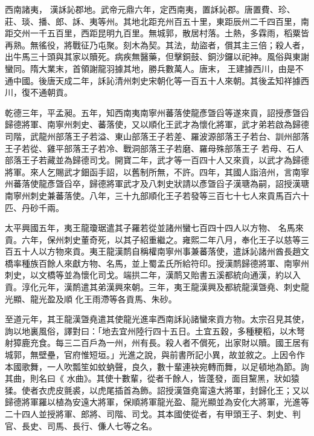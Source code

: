
\begin{pinyinscope}

 西南諸夷，
 漢訸訫郡地。武帝元鼎六年，定西南夷，置訸訫郡。唐置費、珍、莊、琰、播、郎、訸、夷等州。其地北距充州百五十里，東距辰州二千四百里，南距交州一千五百里，西距昆明九百里。無城郭，散居村落。土熱，多霖雨，稻粟皆再熟。無徭役，將戰征乃屯聚。刻木為契。其法，劫盜者，償其主三倍；殺人者，出牛馬三十頭與其家以贖死。病疾無醫藥，但擊銅鼓、銅沙鑼以祀神。風俗與東謝蠻同。隋大業末，首領謝龍羽據其地，勝兵數萬人。唐末，
 王建據西川，由是不通中國。後唐天成二年，訸訫清州刺史宋朝化等一百五十人來朝。其後孟知祥據西川，復不通朝貢。



 乾德三年，平孟昶。五年，知西南夷南寧州蕃落使龍彥曁舀等遂來貢，詔授彥曁舀歸德將軍、南寧州刺史、蕃落使，又以順化王武才為懷化將軍，武才弟若啟為歸德司階，武龍州部落王子若溢、東山部落王子若差、羅波源部落王子若台、訓州部落王子若從、雞平部落王子若冷、戰洞部落王子若磨、羅母殊部落王子
 若母、石人部落王子若藏並為歸德司戈。開寶二年，武才等一百四十人又來貢，以武才為歸德將軍。來人乞賜武才鈿函手詔，以舊制所無，不許。四年，其國人詣涪州，言南寧州蕃落使龍彥曁舀卒，歸德將軍武才及八刺史狀請以彥曁舀子漢瑭為嗣，詔授漢瑭南寧州刺史兼蕃落使。八年，三十九部順化王子若發等三百七十七人來貢馬百六十匹、丹砂千兩。



 太平興國五年，夷王龍瓊琚遣其子羅若從並諸州蠻七百四十四人以方物、
 名馬來貢。六年，保州刺史董奇死，以其子紹重繼之。雍熙二年八月，奉化王子以慈等三百五十人以方物來貢。夷王龍漢鸸自稱權南寧州事兼蕃落使，遣訸訫諸州酋長趙文橋率種族百餘人來獻方物、名馬，並上蜀孟氏所給符印。授漢鸸歸德將軍、南寧州刺史，以文橋等並為懷化司戈。端拱二年，漢鸸又貽書五溪都統向通漢，約以入貢。淳化元年，漢鸸遣其弟漢興來朝。三年，夷王龍漢興及都統龍漢曁堯、刺史龍光顯、龍光盈及順
 化王雨滯等各貢馬、朱砂。



 至道元年，其王龍漢曁堯遣其使龍光進率西南訸訫諸蠻來貢方物。太宗召見其使，詢以地裏風俗，譯對曰：「地去宜州陸行四十五日。土宜五穀，多種粳稻，以木弩射獐鹿充食。每三二百戶為一州，州有長。殺人者不償死，出家財以贖。國王居有城郭，無壁壘，官府惟短垣。」光進之說，與前書所記小異，故並敘之。上因令作本國歌舞，一人吹瓢笙如蚊蚋聲，良久，數十輩連袂宛轉而舞，以足頓地為節。詢其曲，則名曰《
 水曲》。其使十數輩，從者千餘人，皆蓬發，面目黧黑，狀如猿猱。使者衣虎皮氈裘，以虎尾插首為飾。詔授漢曁堯甯遠大將軍，封歸化王；又以歸德將軍羅以植為安遠大將軍，保順將軍龍光盈、龍光顯並為安化大將軍，光進等二十四人並授將軍、郎將、司階、司戈。其本國使從者，有甲頭王子、刺史、判官、長史、司馬、長行、傔人七等之名。




\end{pinyinscope}
